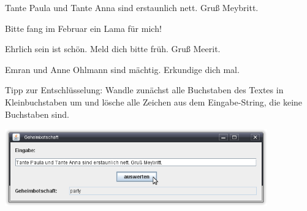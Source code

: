 \begin{compactenum}[1.]
\item Tante Paula und Tante Anna sind erstaunlich nett. Gruß Meybritt.
\item Bitte fang im Februar ein Lama für mich!
\item Ehrlich sein ist schön. Meld dich bitte früh. Gruß Meerit.	
\item Emran und Anne Ohlmann sind mächtig. Erkundige dich mal.
\end{compactenum}

Tipp zur Entschlüsselung: Wandle zunächst alle Buchstaben des Textes in
Kleinbuchstaben um und lösche alle Zeichen aus dem Eingabe-String, die keine
Buchstaben sind.

\begin{center}
\includegraphics[width=0.85\textwidth]{./inf/SEKII/24_Java_GUI-Komponenten/Geheimbotschaft.png}
\end{center}